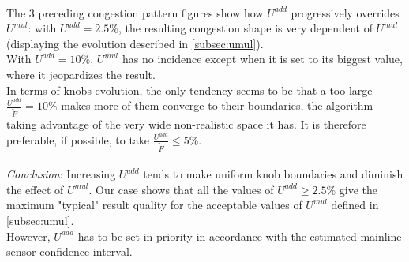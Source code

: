 \\
The $3$ preceding congestion pattern figures show how $U^{add}$ progressively overrides $U^{mul}$: with $U^{add}=2.5\% $, the resulting congestion shape is very dependent of $U^{mul}$ (displaying the evolution described in \ref{subsec:umul}).\\
With $U^{add}=10\% $, $U^{mul}$ has no incidence except when it is set to its biggest value, where it jeopardizes the result.\\


In terms of knobs evolution, the only tendency seems to be that a too large $\frac{U^{add}}{\widetilde{F}}=10\% $ makes more of them converge to their boundaries, the algorithm taking advantage of the very wide non-realistic space it has. It is therefore preferable, if possible, to take $\frac{U^{add}}{\widetilde{F}}\leq 5\% $.\\
\\
\emph{Conclusion}: Increasing $U^{add}$ tends to make uniform knob boundaries and diminish the effect of $U^{mul}$. Our case shows that all the values of $U^{add}\geq 2.5 \% $ give the maximum "typical" result quality for the acceptable values of $U^{mul}$ defined in \ref{subsec:umul}. \\
However, $U^{add}$ has to be set in priority in accordance with the estimated mainline sensor confidence interval.